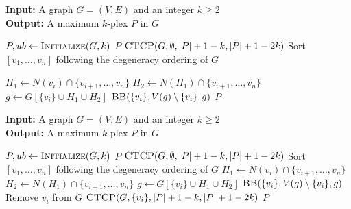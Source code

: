 \documentclass[sigconf, nonacm]{acmart}
\begin{document}
\begin{algorithm}[!t]
\caption{Top-Level Branching -- Oriented Algorithms}
\label{algo:toplevel}

\begin{flushleft}
\textbf{Input:} A graph $G=(V,E)$ and an integer $k\geq 2$\\
\textbf{Output:} A maximum $k$-plex $P$ in $G$
\end{flushleft}

\begin{algorithmic}[1]
\State $P, ub \gets \textsc{Initialize}(G, k)$ 
\label{top:l2}
    \State \Return $P$
\EndIf
\State $\textsc{CTCP}(G, \emptyset, |P|+1-k, |P|+1-2k)$\label{top:l3}
\State Sort $[v_1,\ldots,v_n]$ following the degeneracy ordering of $G$\label{top:l4}

\label{top:l5}
    \State $H_1 \gets N(v_i) \cap \{v_{i+1},\ldots,v_n\}$\label{top:l6}
    \State $H_2 \gets N(H_1) \cap \{v_{i+1},\ldots,v_n\}$\label{top:l7}
    \State $g \gets G[\{v_i\} \cup H_1 \cup H_2]$\label{top:l8}
    \State $\textsc{BB}(\{v_i\}, V(g) \setminus \{v_i\}, g)$ 
\EndFor
\State \Return $P$
\end{algorithmic}
\end{algorithm}

\begin{algorithm}[!t]
\caption{Top-Level Branching -- Forward Direction}
\label{algo:toplevel-c2}

\begin{flushleft}
\textbf{Input:} A graph $G=(V,E)$ and an integer $k\geq 2$\\
\textbf{Output:} A maximum $k$-plex $P$ in $G$
\end{flushleft}

\begin{algorithmic}[1]
\State $P, ub \gets \textsc{Initialize}(G,k)$ 
\label{top-c2:l2}
    \State \Return $P$
\EndIf
\State $\textsc{CTCP}(G, \emptyset, |P|+1-k, |P|+1-2k)$\label{top-c2:l3}
\State Sort $[v_1,\ldots,v_n]$ following the degeneracy ordering of $G$\label{top-c2:l4}
\label{top-c2:l5}
    \State $H_1 \gets N(v_i) \cap \{v_{i+1},\ldots,v_n\}$\label{top-c2:l6}
    \State $H_2 \gets N(H_1) \cap \{v_{i+1},\ldots,v_n\}$\label{top-c2:l7}
    \State $g \gets G[\{v_i\} \cup H_1 \cup H_2]$\label{top-c2:l8}
    \State $\textsc{BB}(\{v_i\}, V(g) \setminus \{v_i\}, g)$ 
    \State Remove $v_i$ from $G$\label{top-c2:l10}
    \State $\textsc{CTCP}(G, \{v_i\}, |P|+1-k, |P|+1-2k)$\label{top-c2:l11}
\EndFor
\State \Return $P$
\end{algorithmic}
\end{algorithm}
\end{document}
